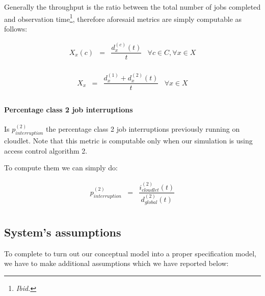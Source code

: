 \documentclass[10pt,a4paper]{article}
\begin{document}
Generally the throughput is the ratio between the total number of jobs completed and observation time\footnote{\textit{Ibid.}}, therefore aforesaid metrics are simply computable as follows:

\begin{equation}
\begin{array} {rccr} 
X_x(c) & = & \displaystyle \dfrac{d_x^{(c)}(t)}{t} & \forall c \in C, \forall x \in X \\
\end{array}
\end{equation}

\begin{equation}
\begin{array} {rccr} 
X_x & = & \displaystyle \dfrac{d_x^{(1)} + d_x^{(2)}(t)}{t} & \forall x \in X \\
\end{array}
\end{equation}

\paragraph{Percentage class 2 job interruptions}

Is $p^{(2)}_{interruption}$ the percentage class 2 job interruptions previously running on cloudlet. Note that this metric is computable only when our simulation is using access control algorithm 2.

To compute them we can simply do:

\begin{equation}
\begin{array} {rccr} 
p^{(2)}_{interruption} & = & \displaystyle \dfrac{i_{cloudlet}^{(2)}(t)}{d_{global}^{(2)}(t)} \\ 
\end{array}
\end{equation}

\subsection{System's assumptions}

To complete to turn out our conceptual model into a proper specification model, we have to make additional assumptions which we have reported below:
\end{document}
